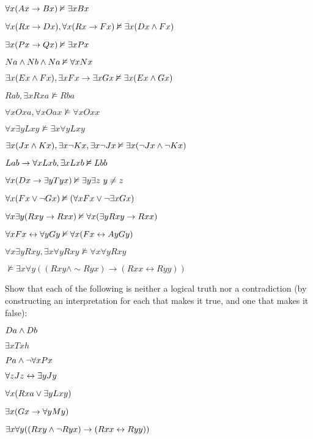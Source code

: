 \begin{earg}
\item $\forall x(Ax \rightarrow Bx) \nvDash \exists x Bx$
\item $\forall x(Rx \rightarrow Dx), \forall x(Rx \rightarrow Fx) \nvDash \exists x(Dx \wedge Fx)$
\item $\exists x(Px\rightarrow Qx) \nvDash \exists x Px$
\item $Na \wedge Nb \wedge Na \nvDash \forall x Nx$
\item $\exists x(Ex \wedge Fx), \exists x Fx \rightarrow \exists x Gx \nvDash \exists x(Ex \wedge Gx)$
\item $Rab, \exists x Rxa \nvDash Rba$
\item $\forall x Oxa, \forall x Oax \nvDash \forall x Oxx$
\item $\forall x \exists yLxy \nvDash \exists x \forall yLxy$
\item $\exists x(Jx \wedge Kx), \exists x \neg Kx, \exists x \neg Jx \nvDash \exists x(\neg Jx \wedge \neg Kx)$
\item $Lab \rightarrow \forall x Lxb, \exists x Lxb \nvDash Lbb$
\item $\forall x(Dx \rightarrow \exists y Tyx) \nvDash \exists y \exists z\  y \neq z$
\item $\forall x (Fx \vee \neg Gx) \nvDash (\forall x Fx \vee \neg \exists x Gx)$
\item $\forall x\exists y(Rxy \rightarrow Rxx) \nvDash \forall x(\exists yRxy \rightarrow Rxx)$
\item $\forall xFx \leftrightarrow \forall yGy \nvDash \forall x(Fx \leftrightarrow AyGy)$
\item $\forall x \exists yRxy , \exists x\forall yRxy \nvDash \forall x \forall y Rxy$
\item $\nvDash \exists x \forall y((Rxy \land \sim Ryx) \rightarrow (Rxx \leftrightarrow Ryy))$
\end{earg}

\problempart
\label{pr.Contingent}
Show that each of the following is neither a logical truth nor a contradiction (by constructing an interpretation for each that makes it true, and one that makes it false):
\begin{earg}
\item  $Da \wedge Db$
\item  $\exists x Txh$
\item  $Pa \wedge \neg\forall x Px$
\item $\forall z Jz \leftrightarrow \exists y Jy$
\item $\forall x (Rxa \vee \exists yLxy)$
\item $\exists x (Gx \rightarrow \forall y My)$
\item $\exists x \forall y((Rxy \wedge \neg Ryx) \rightarrow (Rxx \leftrightarrow Ryy))$
\end{earg}


